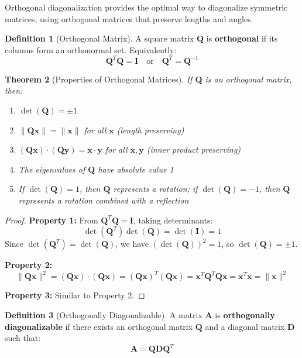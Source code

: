 \documentclass[12pt]{article}
\numberwithin{equation}{section}
\newcommand{\vect}[1]{\boldsymbol{#1}}   %
\newcommand{\mat}[1]{\mathbf{#1}}        %
\theoremstyle{plain}
\newtheorem{theorem}{Theorem}[section]
\theoremstyle{definition}
\newtheorem{definition}[theorem]{Definition}
\theoremstyle{remark}
\begin{document}
Orthogonal diagonalization provides the optimal way to diagonalize symmetric matrices, using orthogonal matrices that preserve lengths and angles.

\begin{definition}[Orthogonal Matrix]
A square matrix $\mat{Q}$ is \textbf{orthogonal} if its columns form an orthonormal set. Equivalently:
$$\mat{Q}^T\mat{Q} = \mat{I} \quad \text{or} \quad \mat{Q}^T = \mat{Q}^{-1}$$
\end{definition}

\begin{theorem}[Properties of Orthogonal Matrices]
If $\mat{Q}$ is an orthogonal matrix, then:
\begin{enumerate}
\item $\det(\mat{Q}) = \pm 1$
\item $\|\mat{Q}\vect{x}\| = \|\vect{x}\|$ for all $\vect{x}$ (length preserving)
\item $(\mat{Q}\vect{x}) \cdot (\mat{Q}\vect{y}) = \vect{x} \cdot \vect{y}$ for all $\vect{x}, \vect{y}$ (inner product preserving)
\item The eigenvalues of $\mat{Q}$ have absolute value 1
\item If $\det(\mat{Q}) = 1$, then $\mat{Q}$ represents a rotation; if $\det(\mat{Q}) = -1$, then $\mat{Q}$ represents a rotation combined with a reflection
\end{enumerate}
\end{theorem}

\begin{proof}
\textbf{Property 1:} From $\mat{Q}^T\mat{Q} = \mat{I}$, taking determinants:
$$\det(\mat{Q}^T)\det(\mat{Q}) = \det(\mat{I}) = 1$$
Since $\det(\mat{Q}^T) = \det(\mat{Q})$, we have $(\det(\mat{Q}))^2 = 1$, so $\det(\mat{Q}) = \pm 1$.

\textbf{Property 2:} 
$$\|\mat{Q}\vect{x}\|^2 = (\mat{Q}\vect{x}) \cdot (\mat{Q}\vect{x}) = (\mat{Q}\vect{x})^T(\mat{Q}\vect{x}) = \vect{x}^T\mat{Q}^T\mat{Q}\vect{x} = \vect{x}^T\vect{x} = \|\vect{x}\|^2$$

\textbf{Property 3:} Similar to Property 2.
\end{proof}

\begin{definition}[Orthogonally Diagonalizable]
A matrix $\mat{A}$ is \textbf{orthogonally diagonalizable} if there exists an orthogonal matrix $\mat{Q}$ and a diagonal matrix $\mat{D}$ such that:
$$\mat{A} = \mat{Q}\mat{D}\mat{Q}^T$$
\end{definition}
\end{document}
